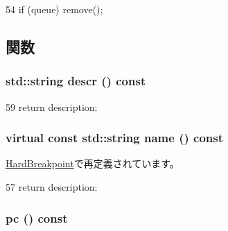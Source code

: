 \begin{DoxyCode}
54 { if (queue) remove(); }
\end{DoxyCode}


\subsection{関数}
\hypertarget{classPCEvent_af881f46ec963ab63a4eb03fa1f5ea728}{
\subsubsection[{descr}]{\setlength{\rightskip}{0pt plus 5cm}std::string descr () const}}
\label{classPCEvent_af881f46ec963ab63a4eb03fa1f5ea728}



\begin{DoxyCode}
59 { return description; }
\end{DoxyCode}
\hypertarget{classPCEvent_adbcff144e5e199d332a1352af1798148}{
\subsubsection[{name}]{\setlength{\rightskip}{0pt plus 5cm}virtual const std::string name () const}}
\label{classPCEvent_adbcff144e5e199d332a1352af1798148}


\hyperlink{classBaseRemoteGDB_1_1HardBreakpoint_a6490f765a824ced1cc94979609fe7e07}{HardBreakpoint}で再定義されています。


\begin{DoxyCode}
57 { return description; }
\end{DoxyCode}
\hypertarget{classPCEvent_a4012b666ba851e747ea4229c7cf55c5b}{
\subsubsection[{pc}]{ pc () const}}
\label{classPCEvent_a4012b666ba851e747ea4229c7cf55c5b}



